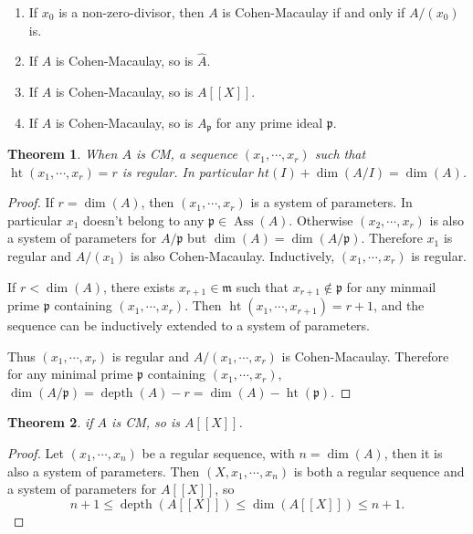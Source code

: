 \documentclass[leqno]{amsart}
\DeclareMathOperator{\hht}{ht}
\DeclareMathOperator{\Ass}{Ass}
\DeclareMathOperator{\depth}{depth}
\newcommand{\1}{\mathbf{1}}
\newcommand{\fm}{\mathfrak m}
\newcommand{\fp}{\mathfrak p}
\newtheorem{thm}{Theorem}[section]
\theoremstyle{definition}
\theoremstyle{remark}
\begin{document}
\begin{enumerate}
	\item If $x_0$ is a non-zero-divisor, then
		 $A$ is Cohen-Macaulay if and only if 
		 $A/(x_0)$ is.
	 \item If $A$ is Cohen-Macaulay, so is $\hat{A}$.
	 \item If $A$ is Cohen-Macaulay, so is $A[[X]]$.
	 \item If $A$ is Cohen-Macaulay, so is $A_\fp$
		 for any prime ideal $\fp$.
\end{enumerate}

\begin{thm}
	When $A$ is CM,
	a sequence $(x_1,\cdots,x_r)$ such that
	$\hht(x_1,\cdots,x_r)=r$ is regular.
	In particular $ht(I)+\dim(A/I)=\dim(A)$.
\end{thm}
\begin{proof}
	If $r=\dim(A)$, then $(x_1,\cdots,x_r)$
	is a system of parameters.
	In particular
	$x_1$ doesn't belong to 
	any $\fp\in \Ass(A)$.
	Otherwise $(x_2,\cdots,x_r)$
	is also a system of parameters 
	for $A/\fp$ but $\dim(A)=\dim(A/\fp)$.
	Therefore $x_1$ is regular
	and $A/(x_1)$ is also Cohen-Macaulay.
	Inductively, 
	$(x_1,\cdots,x_r)$ is regular.


	If $r<\dim(A)$, 
	there exists $x_{r+1}\in \fm$
	such that $x_{r+1}\notin\fp$
	for any minmail prime 
	$\fp$ containing $(x_1,\cdots,x_r)$.
	Then $\hht(x_1,\cdots,x_{r+1})=r+1$,
	and the sequence can be inductively
	extended to a system of parameters.

	Thus $(x_1,\cdots,x_r)$ is regular
	and $A/(x_1,\cdots,x_r)$ is 
	Cohen-Macaulay.
	Therefore for any minimal prime
	$\fp$ containing $(x_1,\cdots,x_r)$,
	$\dim(A/\fp)=\depth(A)-r
	=\dim(A)-\hht(\fp)$.
\end{proof}

\begin{thm}
	if $A$ is CM, so is $A[[X]]$.
\end{thm}
\begin{proof}
	Let $(x_1,\cdots,x_n)$ be a regular sequence,
	with $n=\dim(A)$, then 
	it is also a system of parameters.
	Then  $(X,x_1,\cdots,x_n)$
	is both a regular sequence
	and a system of parameters for $A[[X]]$, so
	\[
		n+1\leq \depth(A[[X]])\leq \dim(A[[X]])\leq n+1.
	\]
\end{proof}
\end{document}
